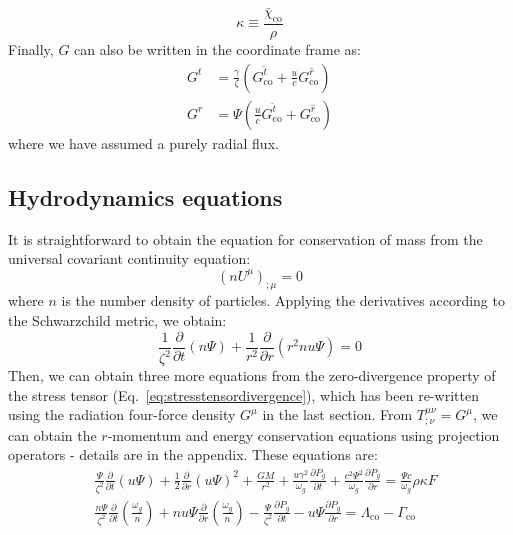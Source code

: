 \documentclass[../main.tex]{subfiles}
\newcommand{\Partial}[2]{\frac{\partial}{\partial#1}\left(#2\right)} %
\begin{document}
\begin{equation}
    \kappa\equiv \frac{\bar{\chi}_\text{co}}{\rho}
\end{equation}
Finally, $G$ can also be written in the coordinate frame as:
\begin{align}
    G^t&=\frac{\gamma}{\zeta}\left(G^{\hat{t}}_\text{co}+\frac{u}{c}G^{\hat{r}}_\text{co}\right)\\
    G^r&=\Psi\left(\frac{u}{c}G^{\hat{t}}_\text{co}+G^{\hat{r}}_\text{co}\right)
\end{align}
where we have assumed a purely radial flux.\\

\subsection{Hydrodynamics equations}
It is straightforward to obtain the equation for conservation of mass from the universal covariant continuity equation:
\begin{equation}
    (nU^\mu)_{;\mu}=0
\end{equation}
where $n$ is the number density of particles. Applying the derivatives according to the Schwarzchild metric, we obtain:
\begin{equation}
\frac{1}{\zeta^2}\Partial{t}{n\Psi}+\frac{1}{r^2}\Partial{r}{r^2n u\Psi} = 0 \label{eq:masscons}
\end{equation}
Then, we can obtain three more equations from the zero-divergence property of the stress tensor (Eq.~\ref{eq:stresstensordivergence}), which has been re-written using the radiation four-force density $G^\mu$ in the last section. From $T^{\mu\nu}_{;\nu}=G^\mu$, we can obtain the $r$-momentum and energy conservation equations using projection operators - details are in the appendix.  These equations are: 
\begin{align}
    &\frac{\Psi}{\zeta^2}\Partial{t}{u \Psi}+\frac{1}{2}\Partial{r}{u\Psi}^2+\frac{GM}{r^2} +\frac{u\gamma^2}{\omega_g}\frac{\partial P_g}{\partial t} +\frac{c^2\Psi^2}{\omega_g}\frac{\partial P_g}{\partial r} = \frac{\Psi c}{\omega_g}\rho\kappa F\label{eq:momcons}\\
    &\frac{n\Psi}{\zeta^2}\Partial{t}{\frac{\omega_g}{n}}+n u\Psi\Partial{r}{\frac{\omega_g}{n}}-\frac{\Psi}{\zeta^2}\frac{\partial P_g}{\partial t}-u\Psi\frac{\partial P_g}{\partial r}=\Lambda_\text{co}-\Gamma_\text{co}\label{eq:enercons}
\end{align}
\end{document}

